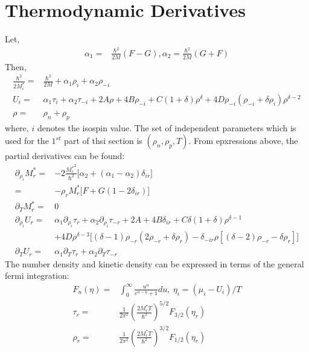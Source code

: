 \documentclass[preprint,prc,preprintnumbers,superscriptaddress,amsmath,amssymb,floatfix]{revtex4-1}
\begin{document}
\section{Thermodynamic Derivatives}
Let,
\begin{equation}
 \begin{split}
  \alpha_1=&\frac{\hbar^2}{2M}(F-G), \alpha_2 =\frac{\hbar^2}{2M} (G+F)
  \end{split}
\end{equation}
Then,
\begin{equation}
 \begin{split}
  \frac{\hbar^2}{2 M^{*}_i}=&\frac{\hbar^2}{2 M}+\alpha_1 \rho_i+\alpha_2 \rho_{-i}\\
  U_i=&\alpha_1 \tau_i+\alpha_2 \tau_{-i}+2A \rho + 4 B \rho_{-i}+ C(1+\delta)\rho^{\delta}+4 D \rho_{-i}(\rho_{-i}+\delta \rho_i)\rho^{\delta-2}\\
  \rho=&\rho_n+\rho_p
 \end{split}
\end{equation}
where, $i$ denotes the isospin value. The set of independent parameters which is used for the $1^{st}$ part of thsi section is $(\rho_n,\rho_p,T)$.
From epxressions above, the partial derivatives can be found:
\begin{equation}
 \begin{split}
  \partial_{\rho_i}M^{*}_r=&-2\frac{{M_r^{*}}^2}{\hbar^2}\big[\alpha_2+(\alpha_1-\alpha_2)\delta_{ir}\big]\\
  =&-\rho_rM_r^{*}\big[F+G(1-2\delta_{ir})\big]\\
  \partial_{T}M^{*}_r =& 0\\
  \partial_{\rho_i}U_r=& \alpha_1 \partial_{\rho_i}\tau_r+\alpha_2 \partial_{\rho_i}\tau_{-r} + 2 A + 4 B \delta_{ir} + C \delta (1+\delta)\rho^{\delta-1}\\
  &+4 D \rho^{\delta-3} \big[(\delta-1)\rho_{-r}(2\rho_{-r}+\delta \rho_r)-\delta_{-ir}\rho [(\delta-2)\rho_{-r}-\delta \rho_r]\big]\\
  \partial_{T}U_r =& \alpha_1 \partial_{T}\tau_r+\alpha_2 \partial_{T}\tau_{-r}
 \end{split}
\end{equation}
The number density and kinetic density can be expressed in terms of the general fermi integration:
\begin{equation}
 \begin{split}
  F_n(\eta)=&\int_0^{\infty}\frac{u^n}{e^{u-\eta}+1}du,\ \eta_i=(\mu_i-U_i)/T\\
  \tau_r=&\frac{1}{2\pi^2}(\frac{2M^{*}_rT}{\hbar^2})^{5/2}F_{3/2}(\eta_r)\\
  \rho_r=&\frac{1}{2\pi^2}(\frac{2M_r^{*}T}{\hbar^2})^{3/2}F_{1/2}(\eta_r)\\
 \end{split}
\end{equation}
\end{document}

